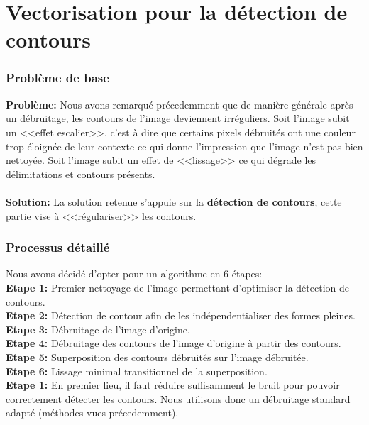 \documentclass{article}
\begin{document}
	\newpage


	\part*{Vectorisation pour la détection de contours}
	
	
		\section{Problème de base}
			\textbf{Problème: }Nous avons remarqué précedemment que de manière générale après un débruitage, les contours de l'image deviennent irréguliers. Soit l'image subit un <<effet escalier>>, c'est à dire que certains pixels débruités ont une couleur trop éloignée de leur contexte ce qui donne l'impression que l'image n'est pas bien nettoyée. Soit l'image subit un effet de <<lissage>> ce qui dégrade les délimitations et contours présents.\\
			\\\textbf{Solution: }La solution retenue s'appuie sur la \textbf{détection de contours}, cette partie vise à <<régulariser>> les contours.
		
		
		
		\section{Processus détaillé}
		 Nous avons décidé d'opter pour un algorithme en 6 étapes:\\
			\textbf{Etape 1: }Premier nettoyage de l'image permettant d'optimiser la détection de contours.\\
			\textbf{Etape 2: }Détection de contour afin de les indépendentialiser des formes pleines.\\
			\textbf{Etape 3: }Débruitage de l'image d'origine.\\
			\textbf{Etape 4: }Débruitage des contours de l'image d'origine à partir des contours.\\
			\textbf{Etape 5: }Superposition des contours débruités sur l'image débruitée.\\
			\textbf{Etape 6: }Lissage minimal transitionnel de la superposition.\\
			
			
			\textbf{Etape 1: }En premier lieu, il faut réduire suffisamment le bruit pour pouvoir correctement détecter les contours. Nous utilisons donc un débruitage standard adapté (méthodes vues précedemment).\\
		
\end{document}
